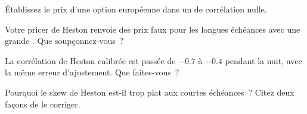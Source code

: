 \begin{interviewq}\label{iq:dv:stochastic-volatility:3}
Établissez le prix d'une option européenne dans un  de corrélation nulle.
\end{interviewq}

\begin{interviewq}\label{iq:dv:stochastic-volatility:4}
Votre pricer de Heston renvoie des prix faux pour les longues échéances avec une grande . Que soupçonnez-vous~?
\end{interviewq}

\begin{interviewq}\label{iq:dv:stochastic-volatility:5}
La corrélation de Heston calibrée est passée de $-0.7$ à $-0.4$ pendant la nuit, avec la même erreur d'ajustement. Que faites-vous~?
\end{interviewq}

\begin{interviewq}\label{iq:dv:stochastic-volatility:6}
Pourquoi le skew de Heston est-il trop plat aux courtes échéances~? Citez deux façons de le corriger.
\end{interviewq}
